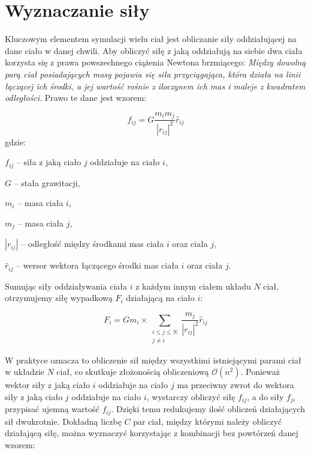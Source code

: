 \documentclass[12pt, twoside, openany]{report}
\begin{document}
\section{Wyznaczanie siły}
\label{wyznaczanie_sily}

Kluczowym elementem symulacji wielu ciał jest obliczanie siły oddziałującej na dane ciało w danej chwili. Aby obliczyć siłę z jaką oddziałują na siebie dwa ciała korzysta się z prawa powszechnego ciążenia Newtona brzmiącego: \textit{Między dowolną parą ciał posiadających masy pojawia się siła przyciągająca, która działa na linii łączącej ich środki, a jej wartość rośnie z iloczynem ich mas i maleje z kwadratem odległości}. Prawo te dane jest wzorem:

\begin{equation}
\label{eq:sila}
f_{ij}=G\frac{m_i m_j}{|r_{ij}|^2} \hat{r}_{ij}
\end{equation}
gdzie:

\indent $ f_{ij} $ -- siła z jaką ciało $j$ oddziałuje na ciało $i$,

\indent $ G $ -- stała grawitacji,

\indent $ m_{i} $ -- masa ciała $i$,

\indent $ m_{j} $ -- masa ciała $j$,

\indent $ |r_{ij}| $ -- odległość między środkami mas ciała $i$ oraz ciała $j$,

\indent $ \hat{r}_{ij} $ -- wersor wektora łączącego środki mas ciała $i$ oraz ciała $j$.

\bigskip


Sumując siły oddziaływania ciała $i$ z każdym innym ciałem układu $N$ ciał, otrzymujemy siłę wypadkową $F_i$ działającą na ciało $i$:

\begin{equation}
\label{eq:sila_wypadkowa}
F_i=Gm_i \times \sum\limits_{\substack{i\le j \le N \\ j \neq i}} \frac{m_j}{|r_{ij}|^2} \hat{r}_{ij}
\end{equation}

W praktyce oznacza to obliczenie sił między wszystkimi istniejącymi parami ciał w układzie $N$ ciał, co skutkuje złożonością obliczeniową $\mathcal{O}(n^2)$. Ponieważ wektor siły z jaką ciało $i$ oddziałuje na ciało $j$ ma przeciwny zwrot do wektora siły z jaką ciało $j$ oddziałuje na ciało $i$, wystarczy obliczyć siłę $f_{ij}$, a do siły $f_{ji}$ przypisać ujemną wartość $f_{ij}$. Dzięki temu redukujemy ilość obliczeń działających sił dwukrotnie. Dokładną liczbę $C$ par ciał, między którymi należy obliczyć działającą siłę, można wyznaczyć korzystając z kombinacji bez powtórzeń danej wzorem:
\end{document}
